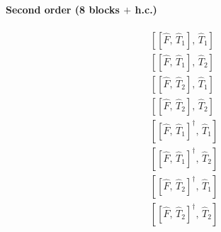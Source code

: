 \documentclass[11pt]{article}
\begin{document}
\paragraph{Second order (8 blocks $+$ h.c.)}
\begin{align}
\left[\left[\hat{F},\, \hat{T}_{1}\right],\, \hat{T}_{1}\right] \\
\left[\left[\hat{F},\, \hat{T}_{1}\right],\, \hat{T}_{2}\right] \\
\left[\left[\hat{F},\, \hat{T}_{2}\right],\, \hat{T}_{1}\right] \\
\left[\left[\hat{F},\, \hat{T}_{2}\right],\, \hat{T}_{2}\right] \\
\left[\left[\hat{F},\, \hat{T}_{1}\right]^{\dagger},\, \hat{T}_{1}\right] \\
\left[\left[\hat{F},\, \hat{T}_{1}\right]^{\dagger},\, \hat{T}_{2}\right] \\
\left[\left[\hat{F},\, \hat{T}_{2}\right]^{\dagger},\, \hat{T}_{1}\right] \\
\left[\left[\hat{F},\, \hat{T}_{2}\right]^{\dagger},\, \hat{T}_{2}\right]
\end{align}
\end{document}
